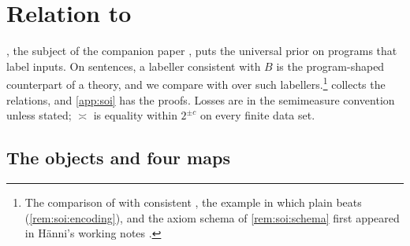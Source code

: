 \section{Relation to \SOI}\label{sec:soi}

\SOI, the subject of the companion paper \citep{claudeSFI2026fundamentals}, puts the universal prior on programs that label inputs. On sentences, a labeller consistent with $B$ is the program-shaped counterpart of a theory, and we compare \SAIabbr with \SOIabbr over such labellers.\footnote{The comparison of \SAIabbr with consistent \SOIabbr, the example in which plain \SOIabbr beats \SAIabbr (\cref{rem:soi:encoding}), and the axiom schema of \cref{rem:soi:schema} first appeared in H\"anni's working notes \citep{hanni2026notes}.}
 collects the relations, and \cref{app:soi} has the proofs. Losses are in the semimeasure convention unless stated; $\asymp$ is equality within $2^{\pm c}$ on every finite data set.

\subsection{The objects and four maps}\label{sec:soi:objects}


